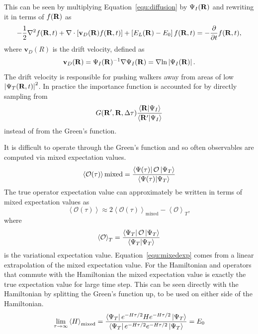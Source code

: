 This can be seen by multiplying Equation~\ref{equ:diffusion} by $\Psi_I(\mathbf{R})$ and rewriting it in terms of $f(\mathbf{R})$ as
\begin{equation}
   -\frac{1}{2}\nabla^2 f(\mathbf{R},t) + \nabla\cdot\left[\mathbf{v}_D(\mathbf{R}) f(\mathbf{R},t)\right] + \left[E_L(\mathbf{R})-E_0\right]f(\mathbf{R},t) = -\frac{\partial}{\partial t} f(\mathbf{R},t),
\end{equation}
where $\mathbf{v}_D(R)$ is the drift velocity, defined as
\begin{equation}
   \mathbf{v}_D(\mathbf{R}) = \Psi_I(\mathbf{R})^{-1}\nabla\Psi_I(\mathbf{R}) = \nabla \text{ln}\left|\Psi_I(\mathbf{R})\right|.
\end{equation}
The drift velocity is responsible for pushing walkers away from areas of low $\left|\Psi_T(\mathbf{R},t)\right|^2$. In practice the importance function is accounted for by directly sampling from
\begin{equation}
   G(\mathbf{R}',\mathbf{R},\Delta\tau)\frac{\left< \mathbf{R} | \Psi_I \right>}{\left< \mathbf{R}' | \Psi_I \right>}
\end{equation}
instead of from the Green's function.

It is difficult to operate through the Green's function and so often observables are computed via mixed expectation values.
\begin{equation}
   \left<\mathcal{O(\tau)}\right>\text{mixed} = \frac{\left< \Psi(\tau) \right|\mathcal{O}\left| \Psi_T \right>}{\left< \Psi(\tau) | \Psi_T \right>}
\end{equation}
The true operator expectation value can approximately be written in terms of mixed expectation values \cite{pudliner1997} as
\begin{equation}
   \left<\mathcal{O(\tau)}\right> \approx 2\left<\mathcal{O(\tau)}\right>_\text{mixed} - \left<\mathcal{O}\right>_T,
   \label{equ:mixedexp}
\end{equation}
where
\begin{equation}
   \left<\mathcal{O}\right>_T = \frac{\left< \Psi_T \right|\mathcal{O}\left| \Psi_T \right>}{\left< \Psi_T | \Psi_T \right>}
\end{equation}
is the variational expectation value. Equation~\ref{equ:mixedexp} comes from a linear extrapolation of the mixed expectation value. For the Hamiltonian and operators that commute with the Hamiltonian the mixed expectation value is exactly the true expectation value for large time step. This can be seen directly with the Hamiltonian by splitting the Green's function up, to be used on either side of the Hamiltonian.
\begin{equation}
   \lim\limits_{\tau\rightarrow\infty}\left<H\right>_\text{mixed} = \frac{\left< \Psi_T \right|e^{-H\tau/2}He^{-H\tau/2}\left| \Psi_T \right>}{\left< \Psi_T \right|e^{-H\tau/2}e^{-H\tau/2}\left| \Psi_T \right>} = E_0
\end{equation}

